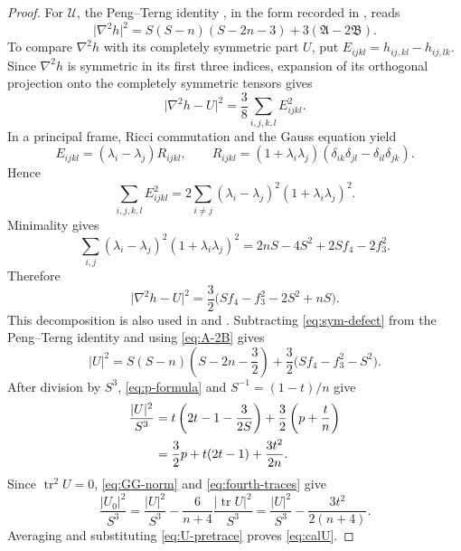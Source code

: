 \documentclass[10pt,a4paper]{amsart}
\numberwithin{equation}{section}
\newcommand{\tr}{\operatorname{tr}}
\newcommand{\norm}[1]{\lvert #1\rvert}
\begin{document}
\begin{proof}
For $\mathcal U$, the Peng--Terng identity \cite{PTseminar,PTannalen}, in the form recorded in \cite[Section~2]{CWY}, reads
\[
\norm{\nabla^2h}^2
=S(S-n)(S-2n-3)+3(\mathfrak A-2\mathfrak B).
\]
To compare $\nabla^2h$ with its completely symmetric part $U$, put
$E_{ijkl}=h_{ij,kl}-h_{ij,lk}$. Since $\nabla^2h$ is symmetric in its first three indices, expansion of its orthogonal projection onto the completely symmetric tensors gives
\[
\norm{\nabla^2h-U}^2=\frac38\sum_{i,j,k,l}E_{ijkl}^2.
\]
In a principal frame, Ricci commutation and the Gauss equation yield
\[
E_{ijkl}=(\lambda_i-\lambda_j)R_{ijkl},
\qquad
R_{ijkl}=(1+\lambda_i\lambda_j)
(\delta_{ik}\delta_{jl}-\delta_{il}\delta_{jk}).
\]
Hence
\[
\sum_{i,j,k,l}E_{ijkl}^2
=2\sum_{i\ne j}(\lambda_i-\lambda_j)^2(1+\lambda_i\lambda_j)^2.
\]
Minimality gives
\[
\sum_{i,j}(\lambda_i-\lambda_j)^2(1+\lambda_i\lambda_j)^2
=2nS-4S^2+2Sf_4-2f_3^2.
\]
Therefore
\begin{equation}\label{eq:sym-defect}
\norm{\nabla^2h-U}^2
=\frac32\bigl(Sf_4-f_3^2-2S^2+nS\bigr).
\end{equation}
This decomposition is also used in \cite[Section~3]{CWY} and \cite[Lemma~3.1]{GeTanYanZhang}. Subtracting \eqref{eq:sym-defect} from the Peng--Terng identity and using
\eqref{eq:A-2B} gives
\[
\norm U^2
=S(S-n)\left(S-2n-\frac32\right)
+\frac32\bigl(Sf_4-f_3^2-S^2\bigr).
\]
After division by $S^3$, \eqref{eq:p-formula} and
$S^{-1}=(1-t)/n$ give
\begin{align}
\frac{\norm U^2}{S^3}
&=t\left(2t-1-\frac{3}{2S}\right)
+\frac32\left(p+\frac tn\right)\notag\\
&=\frac32p+t(2t-1)+\frac{3t^2}{2n}.
\label{eq:U-pretrace}
\end{align}
Since $\tr^2U=0$, \eqref{eq:GG-norm} and \eqref{eq:fourth-traces} give
\[
\frac{\norm{U_0}^2}{S^3}
=\frac{\norm U^2}{S^3}-\frac6{n+4}\frac{\norm{\tr U}^2}{S^3}
=\frac{\norm U^2}{S^3}-\frac{3t^2}{2(n+4)}.
\]
Averaging and substituting \eqref{eq:U-pretrace} proves \eqref{eq:calU}.


\end{proof}
\end{document}
